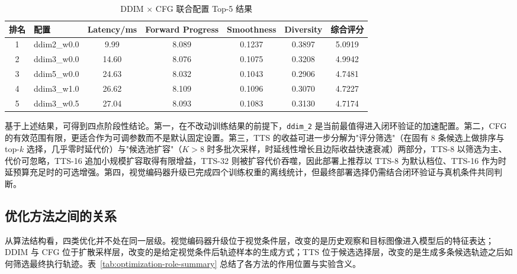 \begin{table}[htbp]
    \centering
    \caption{DDIM $\times$ CFG 联合配置 Top-5 结果}
    \label{tab:joint-ddim-cfg}
    \begin{tabular}{clccccc}
        \toprule
        排名 & 配置 & Latency/ms & Forward Progress & Smoothness & Diversity & 综合评分 \\
        \midrule
        1 & ddim2\_w0.0 & 9.99 & 8.089 & 0.1237 & 0.3897 & 5.0919 \\
        2 & ddim3\_w0.0 & 14.60 & 8.076 & 0.1075 & 0.3208 & 4.9942 \\
        3 & ddim5\_w0.0 & 24.63 & 8.032 & 0.1043 & 0.2906 & 4.7481 \\
        4 & ddim3\_w1.0 & 26.62 & 8.109 & 0.1096 & 0.3070 & 4.7227 \\
        5 & ddim3\_w0.5 & 27.04 & 8.093 & 0.1083 & 0.3130 & 4.7174 \\
        \bottomrule
    \end{tabular}
\end{table}

基于上述结果，可得到四点阶段性结论。第一，在不改动训练结果的前提下，\texttt{ddim\_2} 是当前最值得进入闭环验证的加速配置。第二，CFG 的有效范围有限，更适合作为可调参数而不是默认固定设置。第三，TTS 的收益可进一步分解为"评分筛选"（在固有 8 条候选上做排序与 top-$k$ 选择，几乎零时延代价）与"候选池扩容"（$K>8$ 时多批次采样，时延线性增长且边际收益快速衰减）两部分，TTS-8 以筛选为主、代价可忽略，TTS-16 追加小规模扩容取得有限增益，TTS-32 则被扩容代价吞噬，因此部署上推荐以 TTS-8 为默认档位、TTS-16 作为时延预算充足时的可选增强。第四，视觉编码器升级已完成四个训练权重的离线统计，但最终部署选择仍需结合闭环验证与真机条件共同判断。

\subsection{优化方法之间的关系}

从算法结构看，四类优化并不处在同一层级。视觉编码器升级位于视觉条件层，改变的是历史观察和目标图像进入模型后的特征表达；DDIM 与 CFG 位于扩散采样层，改变的是给定视觉条件后轨迹样本的生成方式；TTS 位于候选选择层，改变的是生成多条候选轨迹之后如何筛选最终执行轨迹。表~\ref{tab:optimization-role-summary} 总结了各方法的作用位置与实验含义。

